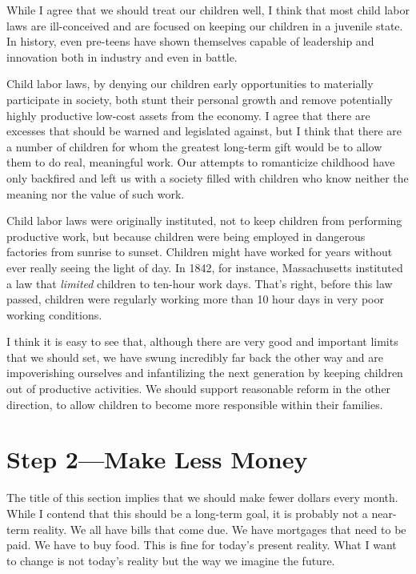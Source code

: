 \begin{policynote}
While I agree that we should treat our children well, I think that most
child labor laws are ill-conceived and are focused on keeping our
children in a juvenile state. In history, even pre-teens have shown
themselves capable of leadership and innovation both in industry and
even in battle. 

Child labor laws, by denying our children early opportunities to
materially participate in society, both stunt their personal growth and
remove potentially highly productive low-cost assets from the economy.
I agree that there are excesses that should be warned and legislated against, but I
think that there are a number of children for whom the greatest
long-term gift would be to allow them to do real, meaningful work. Our
attempts to romanticize childhood have only backfired and left us with
a society filled with children who know neither the meaning nor the
value of such work.

Child labor laws were originally instituted, not to keep children from
performing productive work, but because children were being employed in
dangerous factories from sunrise to sunset. Children might
have worked for years
without ever really seeing the light of day. In 1842, for instance,
Massachusetts instituted a law that \textit{limited} children to
ten-hour work days. That’s right, before this law passed, children were
regularly working more than 10 hour days in very poor working
conditions.

I think it is easy to see that, although there are very good and
important limits that we should set, we have swung incredibly far back
the other way and are impoverishing ourselves and infantilizing
the next generation by keeping children out of productive activities. We should
support reasonable reform in the other direction, to allow children to
become more responsible within their families. 
\end{policynote}

\section{Step 2---Make Less Money}

The title of this section implies that we should make fewer dollars
every month. While I contend that this should be a long-term goal, it
is probably not a near-term reality. We all have bills that come due.
We have mortgages that need to be paid. We have to buy food. This is
fine for today’s present reality. What I want to change is not
today’s reality but the way we imagine the future.

